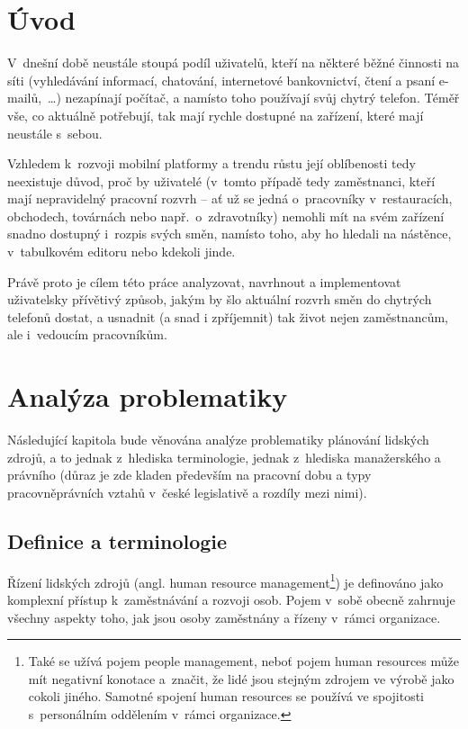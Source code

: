 \documentclass[twoside]{ctuthesis}
\begin{document}
\maketitle

%
\chapter{Úvod}

V~dnešní době neustále stoupá podíl uživatelů, kteří na některé běžné činnosti na síti (vyhledávání informací, chatování, internetové bankovnictví, čtení a psaní e-mailů,~\ldots) nezapínají počítač, a namísto toho používají svůj chytrý telefon. Téměř vše, co aktuálně potřebují, tak mají rychle dostupné na zařízení, které mají neustále s~sebou.

Vzhledem k~rozvoji mobilní platformy a trendu růstu její oblíbenosti tedy neexistuje důvod, proč by uživatelé (v~tomto případě tedy zaměstnanci, kteří mají nepravidelný pracovní rozvrh -- ať už se jedná o~pracovníky v~restauracích, obchodech, továrnách nebo např.~o~zdravotníky) nemohli mít na svém zařízení snadno dostupný i~rozpis svých směn, namísto toho, aby ho hledali na nástěnce, v~tabulkovém editoru nebo kdekoli jinde.

Právě proto je cílem této práce analyzovat, navrhnout a im\-ple\-men\-to\-vat uživatelsky přívětivý způsob, jakým by šlo aktuální rozvrh směn do chytrých telefonů dostat, a usnadnit (a snad i zpříjemnit) tak život nejen zaměstnancům, ale i~vedoucím pracovníkům.


\chapter{Analýza problematiky}
Následující kapitola bude věnována analýze problematiky plánování lidských zdrojů, a to jednak z~hlediska terminologie, jednak z~hlediska manažerského a právního (důraz je zde kladen především na pracovní dobu a typy pracovněprávních vztahů v~české legislativě a rozdíly mezi nimi).

\section{Definice a terminologie}

Řízení lidských zdrojů (angl. human resource management\footnote{Také se užívá pojem people management, neboť pojem human resources může mít negativní konotace a~značit, že lidé jsou stejným zdrojem ve výrobě jako cokoli jiného. \cite[s.~1]{armstrong2014} Samotné spojení human resources se používá ve spojitosti s~personálním oddělením v~rámci organizace. }) je definováno jako komplexní přístup k~zaměstnávání a rozvoji osob. Pojem v~sobě obecně zahrnuje všechny aspekty toho, jak jsou osoby zaměstnány a řízeny v~rámci organizace. \cite[s.~1]{armstrong2014}
\end{document}
